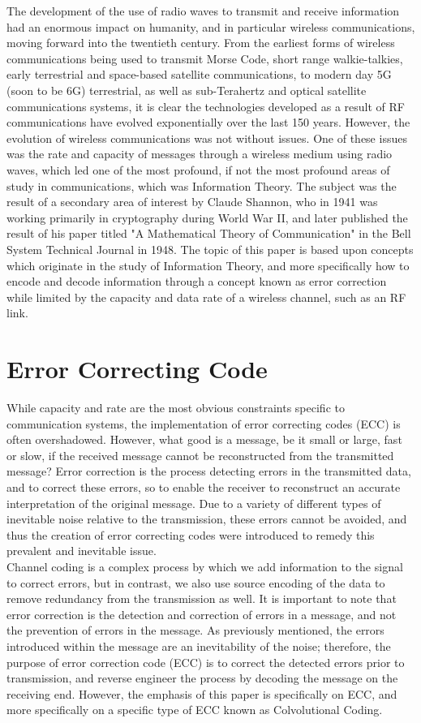 \documentclass[conference]{IEEEtran}
\begin{document}
The development of the use of radio waves to transmit and receive information had an enormous impact on humanity, and in particular wireless communications, moving forward into the twentieth century. From the earliest forms of wireless communications being used to transmit Morse Code, short range walkie-talkies, early terrestrial and space-based satellite communications, to modern day 5G (soon to be 6G) terrestrial, as well as sub-Terahertz and optical satellite communications systems, it is clear the technologies developed as a result of RF communications have evolved exponentially over the last 150 years. However, the evolution of wireless communications was not without issues. One of these issues was the rate and capacity of messages through a wireless medium using radio waves, which led one of the most profound, if not the most profound areas of study in communications, which was Information Theory. The subject was the result of a secondary area of interest by Claude Shannon, who in 1941 was working primarily in cryptography during World War II, and later published the result of his paper titled "A Mathematical Theory of Communication" \cite{b1} in the Bell System Technical Journal in 1948. The topic of this paper is based upon concepts which originate in the study of Information Theory, and more specifically how to encode and decode information through a concept known as error correction while limited by the capacity and data rate of a wireless channel, such as an RF link. 

\section{Error Correcting Code}
While capacity and rate are the most obvious constraints specific to communication systems, the implementation of error correcting codes (ECC) is often overshadowed. However, what good is a message, be it small or large, fast or slow, if the received message cannot be reconstructed from the transmitted message? Error correction is the process detecting errors in the transmitted data, and to correct these errors, so to enable the receiver to reconstruct an accurate interpretation of the original message. Due to a variety of different types of inevitable noise relative to the transmission, these errors cannot be avoided, and thus the creation of error correcting codes were introduced to remedy this prevalent and inevitable issue.\\

Channel coding is a complex process by which we add information to the signal to correct errors, but in contrast, we also use source encoding of the data to remove redundancy from the transmission as well. It is important to note that error correction is the detection and correction of errors in a message, and not the prevention of errors in the message. As previously mentioned, the errors introduced within the message are an inevitability of the noise; therefore, the purpose of error correction code (ECC) is to correct the detected errors prior to transmission, and reverse engineer the process by decoding the message on the receiving end. However, the emphasis of this paper is specifically on ECC, and more specifically on a specific type of ECC known as Colvolutional Coding.
\end{document}
